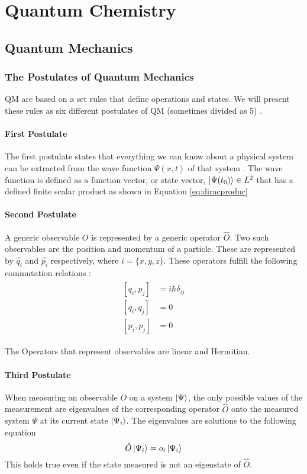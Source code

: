 \documentclass[../master_thesis.tex]{subfiles}
\begin{document}
\chapter{Quantum Chemistry}\label{chap:Quantum_chemistry}
\section{Quantum Mechanics}

\subsection{The Postulates of Quantum Mechanics}

\ac{QM} are based on a set rules that define operations and states. We will
present these rules as six different postulates of \ac{QM} (sometimes divided
as 5) \cite{Atkins:2011, Cohen:1973}.

\subsubsection{First Postulate}
The first postulate states that everything we can know about a physical system
can be extracted from the wave function $\Psi(x, t)$ of that system
\cite{Atkins:2011}. The wave function is defined as a function vector, or
state vector, $\ket{\Psi(t_0)}\in L^2$ that has a defined
finite scalar product as shown in Equation \ref{eq:diracproduc} \cite{Cohen:1973}

\subsubsection{Second Postulate}
A generic observable $O$ is represented by a generic operator
$\hat{O}$. Two such observables are the position and momentum of a particle. These are
represented by $\hat{q_i}$ and $\hat{p_i}$ respectively, where
$i = \{x, y, z\}$. These operators fulfill the following commutation relations
\cite{Atkins:2011, Cohen:1973}:
\begin{align}
  \begin{split}
    [q_i, p_j] &= i \hbar \delta_{ij}\\
    [q_i, q_j] &= 0 \\
    [p_i, p_j] &= 0
  \end{split}
\end{align}

The Operators that represent observables are linear and Hermitian.

\subsubsection{Third Postulate}
When measuring an observable $O$ on a system $\ket{\Psi}$, the only possible
values of the measurement are eigenvalues of the corresponding operator $\hat{O}$
onto the measured system $\Psi$ at its current state $\ket{\Psi_i}$. The eigenvalues
are solutions to the following equation \cite{Cohen:1973}
\begin{equation}
  \hat{O}\ket{\Psi_i} = o_i \ket{\Psi_i}
\end{equation}
This holds true even if the state measured is not an eigenstate of $\hat{O}$.
\end{document}
